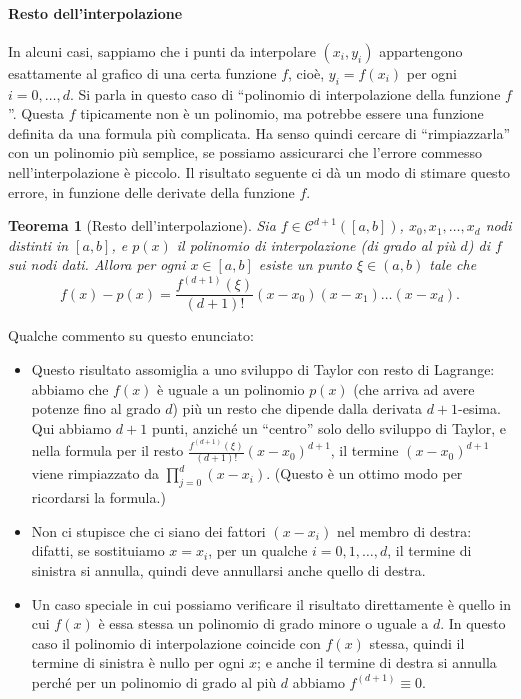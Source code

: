 \documentclass[a4paper]{report}
\newtheorem{theorem}{Teorema}[chapter]
\theoremstyle{definition}
\theoremstyle{remark}
\begin{document}
\paragraph{Resto dell'interpolazione}
In alcuni casi, sappiamo che i punti da interpolare $(x_i,y_i)$ appartengono esattamente al grafico di una certa funzione $f$, cioè, $y_i = f(x_i)$ per ogni $i=0,\dots,d$. Si parla in questo caso di ``polinomio di interpolazione della funzione $f$''. Questa $f$ tipicamente non è un polinomio, ma potrebbe essere una funzione definita da una formula più complicata. Ha senso quindi cercare di ``rimpiazzarla'' con un polinomio più semplice, se possiamo assicurarci che l'errore commesso nell'interpolazione è piccolo. Il risultato seguente ci dà un modo di stimare questo errore, in funzione delle derivate della funzione $f$.
\begin{theorem}[Resto dell'interpolazione] \label{thm:resto dell'interpolazione}
Sia $f\in \mathcal{C}^{d+1}([a,b])$, $x_0,x_1,\dots,x_d$ nodi distinti in $[a,b]$, e $p(x)$ il polinomio di interpolazione (di grado al più $d$) di $f$ sui nodi dati. Allora per ogni $x\in [a,b]$ esiste un punto $\xi \in (a,b)$ tale che
\begin{equation} \label{resto dell'interpolazione}
    f(x) - p(x) = \frac{f^{(d+1)}(\xi)}{(d+1)!} (x-x_0)(x-x_1) \dots (x-x_d).    
\end{equation}
\end{theorem}
Qualche commento su questo enunciato:
\begin{itemize}
    \item Questo risultato assomiglia a uno sviluppo di Taylor con resto di Lagrange: abbiamo che $f(x)$ è uguale a un polinomio $p(x)$ (che arriva ad avere potenze fino al grado $d$) più un resto che dipende dalla derivata $d+1$-esima. Qui abbiamo $d+1$ punti, anziché un ``centro'' solo dello sviluppo di Taylor, e nella formula per il resto $\frac{f^{(d+1)}(\xi)}{(d+1)!}(x-x_0)^{d+1}$, il termine $(x-x_0)^{d+1}$ viene rimpiazzato da $\prod_{j=0}^d (x-x_i)$. (Questo è un ottimo modo per ricordarsi la formula.)
    \item Non ci stupisce che ci siano dei fattori $(x-x_i)$ nel membro di destra: difatti, se sostituiamo $x=x_i$, per un qualche $i=0,1,\dots,d$, il termine di sinistra si annulla, quindi deve annullarsi anche quello di destra.
    \item Un caso speciale in cui possiamo verificare il risultato direttamente è quello in cui $f(x)$ è essa stessa un polinomio di grado minore o uguale a $d$. In questo caso il polinomio di interpolazione coincide con $f(x)$ stessa, quindi il termine di sinistra è nullo per ogni $x$; e anche il termine di destra si annulla perché per un polinomio di grado al più $d$ abbiamo $f^{(d+1)} \equiv 0$.
\end{itemize}
\end{document}
